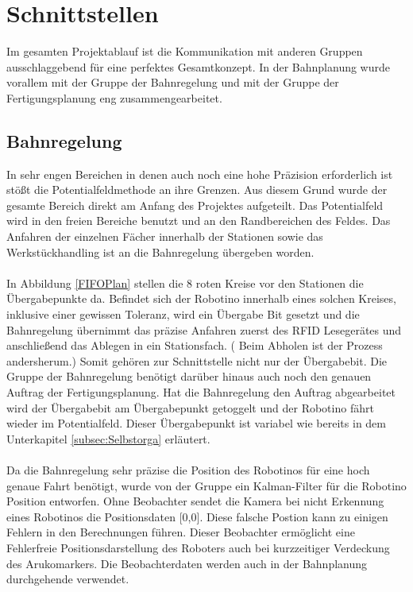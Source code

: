 \section{Schnittstellen}
Im gesamten Projektablauf ist die Kommunikation mit anderen Gruppen ausschlaggebend für eine perfektes Gesamtkonzept.
In der Bahnplanung wurde vorallem mit der Gruppe der Bahnregelung und mit der Gruppe der Fertigungsplanung eng zusammengearbeitet.
\subsection{Bahnregelung}
In sehr engen Bereichen in denen auch noch eine hohe Präzision erforderlich ist stößt die Potentialfeldmethode an ihre Grenzen. Aus diesem Grund wurde der gesamte Bereich direkt am Anfang des Projektes aufgeteilt. Das Potentialfeld wird in den freien Bereiche benutzt und an den Randbereichen des Feldes. Das Anfahren der einzelnen Fächer innerhalb der Stationen sowie das Werkstückhandling ist an die Bahnregelung übergeben worden.\\
\\
In Abbildung \ref{FIFOPlan} stellen die 8 roten Kreise vor den Stationen die Übergabepunkte da. Befindet sich der Robotino innerhalb eines solchen Kreises, inklusive einer gewissen Toleranz, wird ein Übergabe Bit gesetzt und die Bahnregelung übernimmt das präzise Anfahren zuerst des RFID Lesegerätes und anschließend das Ablegen in ein Stationsfach. ( Beim Abholen ist der Prozess andersherum.)
Somit gehören zur Schnittstelle nicht nur der Übergabebit. Die Gruppe der Bahnregelung benötigt darüber hinaus auch noch den genauen Auftrag der Fertigungsplanung. Hat die Bahnregelung den Auftrag abgearbeitet wird der Übergabebit am Übergabepunkt getoggelt und der Robotino fährt wieder im Potentialfeld. Dieser Übergabepunkt ist variabel wie bereits in dem Unterkapitel \ref{subsec:Selbstorga} erläutert.\\
\\  
Da die Bahnregelung sehr präzise die Position des Robotinos für eine hoch genaue Fahrt benötigt, wurde von der Gruppe ein Kalman-Filter für die Robotino Position entworfen. Ohne Beobachter sendet die Kamera bei nicht Erkennung eines Robotinos die Positionsdaten [0,0]. Diese falsche Postion kann zu einigen Fehlern in den Berechnungen führen. Dieser Beobachter ermöglicht eine Fehlerfreie Positionsdarstellung des Roboters auch bei kurzzeitiger Verdeckung des Arukomarkers. Die Beobachterdaten werden auch in der Bahnplanung durchgehende verwendet. 
\newpage
